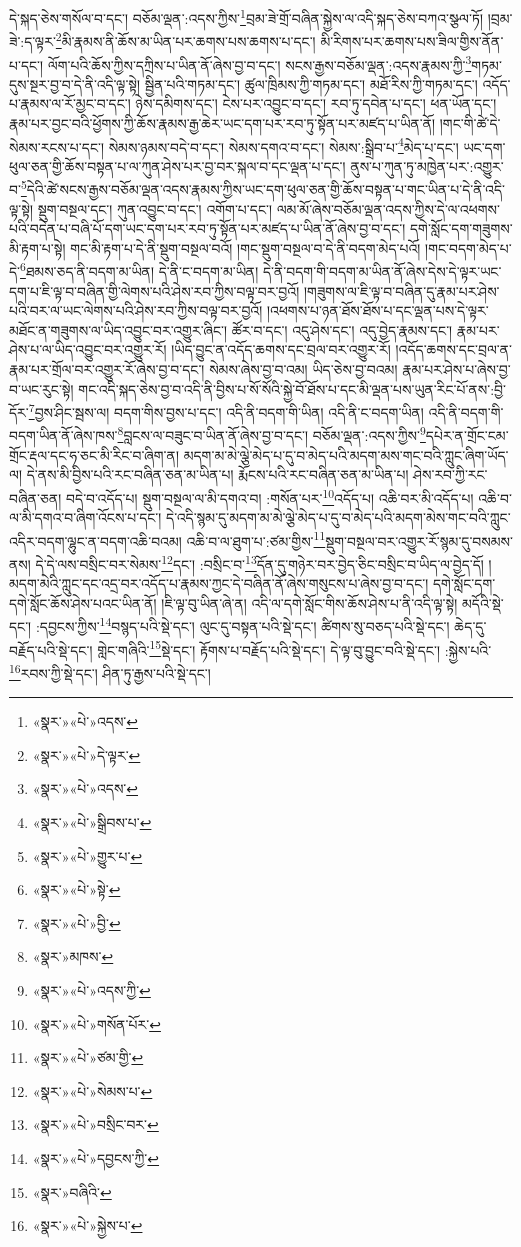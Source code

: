 དེ་སྐད་ཅེས་གསོལ་བ་དང་། བཅོམ་ལྡན་:འདས་ཀྱིས་\footnote{«སྣར་»«པེ་»འདས་}བྲམ་ཟེ་གྲོ་བཞིན་སྐྱེས་ལ་འདི་སྐད་ཅེས་བཀའ་སྩལ་ཏོ། །བྲམ་ཟེ་:ད་ལྟར་\footnote{«སྣར་»«པེ་»དེ་ལྟར་}མི་རྣམས་ནི་ཆོས་མ་ཡིན་པར་ཆགས་པས་ཆགས་པ་དང་། མི་རིགས་པར་ཆགས་པས་ཟིལ་གྱིས་ནོན་པ་དང་། ལོག་པའི་ཆོས་ཀྱིས་དཀྲིས་པ་ཡིན་ནོ་ཞེས་བྱ་བ་དང་། སངས་རྒྱས་བཅོམ་ལྡན་:འདས་རྣམས་ཀྱི་\footnote{«སྣར་»«པེ་»འདས་}གཏམ་དུས་སྔར་བྱ་བ་དེ་ནི་འདི་ལྟ་སྟེ། སྦྱིན་པའི་གཏམ་དང་། ཚུལ་ཁྲིམས་ཀྱི་གཏམ་དང་། མཐོ་རིས་ཀྱི་གཏམ་དང་། འདོད་པ་རྣམས་ལ་རོ་མྱང་བ་དང་། ཉེས་དམིགས་དང་། ངེས་པར་འབྱུང་བ་དང་། རབ་ཏུ་དབེན་པ་དང་། ཕན་ཡོན་དང་། རྣམ་པར་བྱང་བའི་ཕྱོགས་ཀྱི་ཆོས་རྣམས་རྒྱ་ཆེར་ཡང་དག་པར་རབ་ཏུ་སྟོན་པར་མཛད་པ་ཡིན་ནོ། །གང་གི་ཚེ་དེ་སེམས་རངས་པ་དང་། སེམས་ཉམས་བདེ་བ་དང་། སེམས་དགའ་བ་དང་། སེམས་:སྒྲིབ་པ་\footnote{«སྣར་»«པེ་»སྒྲིབས་པ་}མེད་པ་དང་། ཡང་དག་ཕུལ་ཅན་གྱི་ཆོས་བསྟན་པ་ལ་ཀུན་ཤེས་པར་བྱ་བར་སྐལ་བ་དང་ལྡན་པ་དང་། ནུས་པ་ཀུན་ཏུ་མཁྱེན་པར་:འགྱུར་བ་\footnote{«སྣར་»«པེ་»གྱུར་པ་}དེའི་ཚེ་སངས་རྒྱས་བཅོམ་ལྡན་འདས་རྣམས་ཀྱིས་ཡང་དག་ཕུལ་ཅན་གྱི་ཆོས་བསྟན་པ་གང་ཡིན་པ་དེ་ནི་འདི་ལྟ་སྟེ། སྡུག་བསྔལ་དང་། ཀུན་འབྱུང་བ་དང་། འགོག་པ་དང་། ལམ་མོ་ཞེས་བཅོམ་ལྡན་འདས་ཀྱིས་དེ་ལ་འཕགས་པའི་བདེན་པ་བཞི་པོ་དག་ཡང་དག་པར་རབ་ཏུ་སྟོན་པར་མཛད་པ་ཡིན་ནོ་ཞེས་བྱ་བ་དང་། དགེ་སློང་དག་གཟུགས་མི་རྟག་པ་སྟེ། གང་མི་རྟག་པ་དེ་ནི་སྡུག་བསྔལ་བའོ། །གང་སྡུག་བསྔལ་བ་དེ་ནི་བདག་མེད་པའོ། །གང་བདག་མེད་པ་དེ་\footnote{«སྣར་»«པེ་»སྟེ་}ཐམས་ཅད་ནི་བདག་མ་ཡིན། དེ་ནི་ང་བདག་མ་ཡིན། དེ་ནི་བདག་གི་བདག་མ་ཡིན་ནོ་ཞེས་དེས་དེ་ལྟར་ཡང་དག་པ་ཇི་ལྟ་བ་བཞིན་གྱི་ལེགས་པའི་ཤེས་རབ་ཀྱིས་བལྟ་བར་བྱའོ། །གཟུགས་ལ་ཇི་ལྟ་བ་བཞིན་དུ་རྣམ་པར་ཤེས་པའི་བར་ལ་ཡང་ལེགས་པའི་ཤེས་རབ་ཀྱིས་བལྟ་བར་བྱའོ། །འཕགས་པ་ཉན་ཐོས་ཐོས་པ་དང་ལྡན་པས་དེ་ལྟར་མཐོང་ན་གཟུགས་ལ་ཡིད་འབྱུང་བར་འགྱུར་ཞིང་། ཚོར་བ་དང་། འདུ་ཤེས་དང་། འདུ་བྱེད་རྣམས་དང་། རྣམ་པར་ཤེས་པ་ལ་ཡིད་འབྱུང་བར་འགྱུར་རོ། །ཡིད་བྱུང་ན་འདོད་ཆགས་དང་བྲལ་བར་འགྱུར་རོ། །འདོད་ཆགས་དང་བྲལ་ན་རྣམ་པར་གྲོལ་བར་འགྱུར་རོ་ཞེས་བྱ་བ་དང་། སེམས་ཞེས་བྱ་བ་འམ། ཡིད་ཅེས་བྱ་བའམ། རྣམ་པར་ཤེས་པ་ཞེས་བྱ་བ་ཡང་རུང་སྟེ། གང་འདི་སྐད་ཅེས་བྱ་བ་འདི་ནི་བྱིས་པ་སོ་སོའི་སྐྱེ་བོ་ཐོས་པ་དང་མི་ལྡན་པས་ཡུན་རིང་པོ་ནས་:བྱི་དོར་\footnote{«སྣར་»«པེ་»བྱི་}བྱས་ཤིང་སྦས་ལ། བདག་གིས་བྱས་པ་དང་། འདི་ནི་བདག་གི་ཡིན། འདི་ནི་ང་བདག་ཡིན། འདི་ནི་བདག་གི་བདག་ཡིན་ནོ་ཞེས་ཁས་\footnote{«སྣར་»མཁས་}བླངས་ལ་བཟུང་བ་ཡིན་ནོ་ཞེས་བྱ་བ་དང་། བཅོམ་ལྡན་:འདས་ཀྱིས་\footnote{«སྣར་»«པེ་»འདས་ཀྱི་}དཔེར་ན་གྲོང་ངམ་གྲོང་རྡལ་དང་ཧ་ཅང་མི་རིང་བ་ཞིག་ན། མདག་མ་མེ་ལྕེ་མེད་པ་དུ་བ་མེད་པའི་མདག་མས་གང་བའི་ཀླུང་ཞིག་ཡོད་ལ། དེ་ནས་མི་བྱིས་པའི་རང་བཞིན་ཅན་མ་ཡིན་པ། རྨོངས་པའི་རང་བཞིན་ཅན་མ་ཡིན་པ། ཤེས་རབ་ཀྱི་རང་བཞིན་ཅན། བདེ་བ་འདོད་པ། སྡུག་བསྔལ་ལ་མི་དགའ་བ། :གསོན་པར་\footnote{«སྣར་»«པེ་»གསོན་པོར་}འདོད་པ། འཆི་བར་མི་འདོད་པ། འཆི་བ་ལ་མི་དགའ་བ་ཞིག་འོངས་པ་དང་། དེ་འདི་སྙམ་དུ་མདག་མ་མེ་ལྕེ་མེད་པ་དུ་བ་མེད་པའི་མདག་མེས་གང་བའི་ཀླུང་འདིར་བདག་ལྷུང་ན་བདག་འཆི་བའམ། འཆི་བ་ལ་ཐུག་པ་:ཙམ་གྱིས་\footnote{«སྣར་»«པེ་»ཙམ་གྱི་}སྡུག་བསྔལ་བར་འགྱུར་རོ་སྙམ་དུ་བསམས་ནས། དེ་དེ་ལས་བསྲིང་བར་སེམས་\footnote{«སྣར་»«པེ་»སེམས་པ་}དང་། :བསྲིང་བ་\footnote{«སྣར་»«པེ་»བསྲིང་བར་}དོན་དུ་གཉེར་བར་བྱེད་ཅིང་བསྲིང་བ་ཡིད་ལ་བྱེད་དོ། །མདག་མེའི་ཀླུང་དང་འདྲ་བར་འདོད་པ་རྣམས་ཀྱང་དེ་བཞིན་ནོ་ཞེས་གསུངས་པ་ཞེས་བྱ་བ་དང་། དགེ་སློང་དག་དགེ་སློང་ཆོས་ཤེས་པའང་ཡིན་ནོ། །ཇི་ལྟ་བུ་ཡིན་ཞེ་ན། འདི་ལ་དགེ་སློང་གིས་ཆོས་ཤེས་པ་ནི་འདི་ལྟ་སྟེ། མདོའི་སྡེ་དང་། :དབྱངས་ཀྱིས་\footnote{«སྣར་»«པེ་»དབྱངས་ཀྱི་}བསྙད་པའི་སྡེ་དང་། ལུང་དུ་བསྟན་པའི་སྡེ་དང་། ཚིགས་སུ་བཅད་པའི་སྡེ་དང་། ཆེད་དུ་བརྗོད་པའི་སྡེ་དང་། གླེང་གཞིའི་\footnote{«སྣར་»བཞིའི་}སྡེ་དང་། རྟོགས་པ་བརྗོད་པའི་སྡེ་དང་། དེ་ལྟ་བུ་བྱུང་བའི་སྡེ་དང་། :སྐྱེས་པའི་\footnote{«སྣར་»«པེ་»སྐྱེས་པ་}རབས་ཀྱི་སྡེ་དང་། ཤིན་ཏུ་རྒྱས་པའི་སྡེ་དང་། 